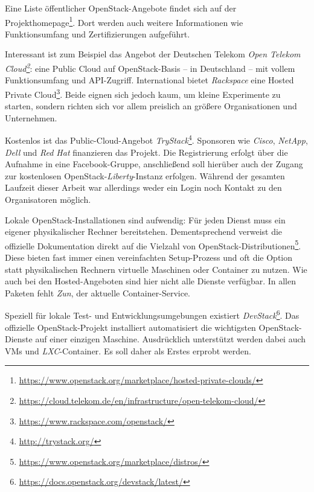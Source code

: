 \noindent Eine Liste öffentlicher OpenStack-Angebote findet sich auf der Projekthomepage\footnote{\url{https://www.openstack.org/marketplace/hosted-private-clouds/}}. Dort werden auch weitere Informationen wie Funktionsumfang und Zertifizierungen aufgeführt. 

Interessant ist zum Beispiel das Angebot der Deutschen Telekom \emph{Open Telekom Cloud\footnote{\url{https://cloud.telekom.de/en/infrastructure/open-telekom-cloud/}}}: eine Public Cloud auf OpenStack-Basis -- in Deutschland -- mit vollem Funktionsumfang und API-Zugriff. International bietet \emph{Rackspace} eine Hosted Private Cloud\footnote{\url{https://www.rackspace.com/openstack/}}. Beide eignen sich jedoch kaum, um kleine Experimente zu starten, sondern richten sich vor allem preislich an größere Organisationen und Unternehmen.

Kostenlos ist das Public-Cloud-Angebot \emph{TryStack}\footnote{\url{http://trystack.org/}}. Sponsoren wie \emph{Cisco}, \emph{NetApp}, \emph{Dell} und \emph{Red Hat} finanzieren das Projekt. Die Registrierung erfolgt über die Aufnahme in eine Facebook-Gruppe, anschließend soll hierüber auch der Zugang zur kostenlosen OpenStack-\emph{Liberty}-Instanz erfolgen. Während der gesamten Laufzeit dieser Arbeit war allerdings weder ein Login noch Kontakt zu den Organisatoren möglich.

Lokale OpenStack-Installationen sind aufwendig: Für jeden Dienst muss ein eigener physikalischer Rechner bereitstehen. Dementsprechend verweist die offizielle Dokumentation direkt auf die Vielzahl von OpenStack-Distributionen\footnote{\url{https://www.openstack.org/marketplace/distros/}}. Diese bieten fast immer einen vereinfachten Setup-Prozess und oft die Option statt physikalischen Rechnern virtuelle Maschinen oder Container zu nutzen. Wie auch bei den Hosted-Angeboten sind hier nicht alle Dienste verfügbar. In allen Paketen fehlt \emph{Zun}, der aktuelle Container-Service.

Speziell für lokale Test- und Entwicklungsumgebungen existiert \emph{DevStack}\footnote{\url{https://docs.openstack.org/devstack/latest/}}. Das offizielle OpenStack-Projekt installiert automatisiert die wichtigsten OpenStack-Dienste auf einer einzigen Maschine. Ausdrücklich unterstützt werden dabei auch VMs und \emph{LXC}-Container. Es soll daher als Erstes erprobt werden.